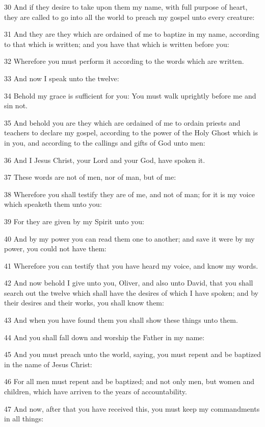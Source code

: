 				30 And if they desire to take upon them my name, with full purpose of heart, they are called to go into all the world to preach my gospel unto every creature:

				31 And they are they which are ordained of me to baptize in my name, according to that which is written; and you have that which is written before you:

				32 Wherefore you must perform it according to the words which are written.

				33 And now I speak unto the twelve:

				34 Behold my grace is sufficient for you: You must walk uprightly before me and sin not.

				35 And behold you are they which are ordained of me to ordain priests and teachers to declare my gospel, according to the power of the Holy Ghost which is in you, and according to the callings and gifts of God unto men:

				36 And I Jesus Christ, your Lord and your God, have spoken it.

				37 These words are not of men, nor of man, but of me:

				38 Wherefore you shall testify they are of me, and not of man; for it is my voice which speaketh them unto you:

				39 For they are given by my Spirit unto you:

				40 And by my power you can read them one to another; and save it were by my power, you could not have them:

				41 Wherefore you can testify that you have heard my voice, and know my words.

				42 And now behold I give unto you, Oliver, and also unto David, that you shall search out the twelve which shall have the desires of which I have spoken; and by their desires and their works, you shall know them:

				43 And when you have found them you shall show these things unto them.

				44 And you shall fall down and worship the Father in my name:

				45 And you must preach unto the world, saying, you must repent and be baptized in the name of Jesus Christ:

				46 For all men must repent and be baptized; and not only men, but women and children, which have arriven to the years of accountability.

				47 And now, after that you have received this, you must keep my commandments in all things:

